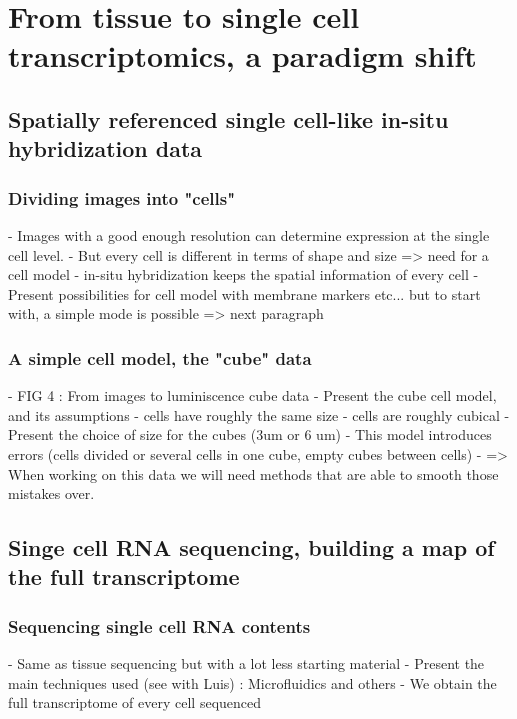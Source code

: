 \chapter{From tissue to single cell transcriptomics, a paradigm shift}\label{ch:singlecell}
\section{Spatially referenced single cell-like in-situ hybridization data}
  \subsection*{Dividing images into "cells"}
    - Images with a good enough resolution can determine expression at the single cell level.
    - But every cell is different in terms of shape and size => need for a cell model
    - in-situ hybridization keeps the spatial information of every cell
    - Present possibilities for cell model with membrane markers etc... but to start with, a simple mode is possible => next paragraph

  \subsection*{A simple cell model, the "cube" data}
    - FIG 4 : From images to luminiscence cube data
    - Present the cube cell model, and its assumptions
    - cells have roughly the same size 
    - cells are roughly cubical
    - Present the choice of size for the cubes (3um or 6 um)
    - This model introduces errors (cells divided or several cells in one cube, empty cubes between cells)
    - => When working on this data we will need methods that are able to smooth those mistakes over.

\section{Singe cell RNA sequencing, building a map of the full transcriptome}
  \subsection*{Sequencing single cell RNA contents}
    - Same as tissue sequencing but with a lot less starting material
    - Present the main techniques used (see with Luis) : Microfluidics and others
    - We obtain the full transcriptome of every cell sequenced


